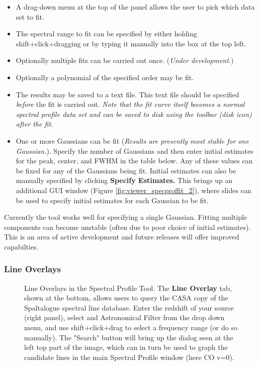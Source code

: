 \begin{itemize}
\item A drag-down menu at the top of the panel allows the user to pick which data set to fit.
\item The spectral range to fit can be specified by either holding shift+click+dragging or by typing it manually
into the box at the top left.
\item Optionally multiple fits can be carried out once. ({\em Under development.})
\item Optionally a polynomial of the specified order may be fit. 
\item The results may be saved to a text file. This text file should be specified {\em before} the fit is carried out. {\em Note that 
the fit curve itself becomes a normal spectral profile data set and can be saved to disk using the toolbar (disk icon) after the 
fit.}
\item One or more Gaussians can be fit ({\em Results are presently most stable for one Gaussian.}). Specify the number of
Gaussians and then enter initial estimates for the peak, center, and FWHM in the table below. Any of these values can be fixed
for any of the Gaussians being fit. Initial estimates can also be manually specified by clicking {\bf Specify Estimates.} This brings up an additional 
GUI window (Figure \ref{fig:viewer_specproffit_2}), where slides can be used to specify initial estimates for each Gaussian to be fit.
\end{itemize}

Currently the tool works well for specifying a single Gaussian. Fitting multiple components can become unstable (often due to poor 
choice of initial estimates). This is an area of active development and future releases will offer improved capabilties.

\subsubsection{Line Overlays}
\label{section:display.image.specprof.lineoverlay}

\begin{figure}[h!]
\begin{center}
\caption{\label{fig:viewer_lineoverlay} Line Overlays in the Spectral Profile Tool. The {\bf Line Overlay} tab, shown at the bottom,
allows users to query the CASA copy of the Spaltalogue spectral line database. Enter the redshift of your source (right panel),
select and Astronomical Filter from the drop down menu, and use shift+click+drag to select a frequency range (or do so manually). 
The "Search" button will bring up the dialog seen at the left top part of the image, which can in turn be used to graph the candidate
lines in the main Spectral Profile window (here CO v=0).}
\hrulefill
\end{center}
\end{figure}

